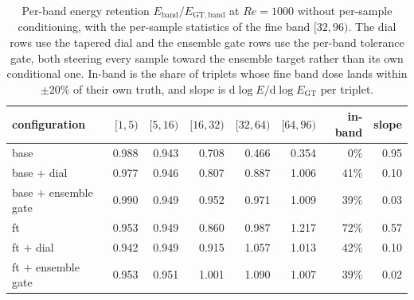 \begin{table}[H]
  \centering
  \caption{Per-band energy retention $E_{\mathrm{band}}/E_{\mathrm{GT,band}}$ at $Re{=}1000$ without per-sample conditioning, with the per-sample statistics of the fine band $[32,96)$. The dial rows use the tapered dial and the ensemble gate rows use the per-band tolerance gate, both steering every sample toward the ensemble target rather than its own conditional one. In-band is the share of triplets whose fine band dose lands within $\pm20\%$ of their own truth, and slope is $\mathrm{d}\log E/\mathrm{d}\log E_{\mathrm{GT}}$ per triplet.}
  \label{tab:re1k-perband-ensemble}
  \begin{tabular}{lrrrrrrr}
    \toprule
    configuration & $[1,5)$ & $[5,16)$ & $[16,32)$ & $[32,64)$ & $[64,96)$ & in-band & slope \\
    \midrule
    base & 0.988 & 0.943 & 0.708 & 0.466 & 0.354 & 0\% & 0.95 \\
    base $+$ dial & 0.977 & 0.946 & 0.807 & 0.887 & 1.006 & 41\% & 0.10 \\
    base $+$ ensemble gate & 0.990 & 0.949 & 0.952 & 0.971 & 1.009 & 39\% & 0.03 \\
    \midrule
    ft & 0.953 & 0.949 & 0.860 & 0.987 & 1.217 & 72\% & 0.57 \\
    ft $+$ dial & 0.942 & 0.949 & 0.915 & 1.057 & 1.013 & 42\% & 0.10 \\
    ft $+$ ensemble gate & 0.953 & 0.951 & 1.001 & 1.090 & 1.007 & 39\% & 0.02 \\
    \bottomrule
  \end{tabular}
\end{table}
